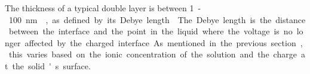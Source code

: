     The thickness of a typical double layer is between \SI{1}-\SI{100}{\nano\meter}~\cite{Jiang2010}, as defined by its Debye length~\cite{Israelachvili2011}.
    The Debye length is the distance between the interface and the point in the liquid where the voltage is no longer affected by the charged interface.
    As mentioned in the previous section, this varies based on the ionic concentration of the solution and the charge at the solid's surface.







